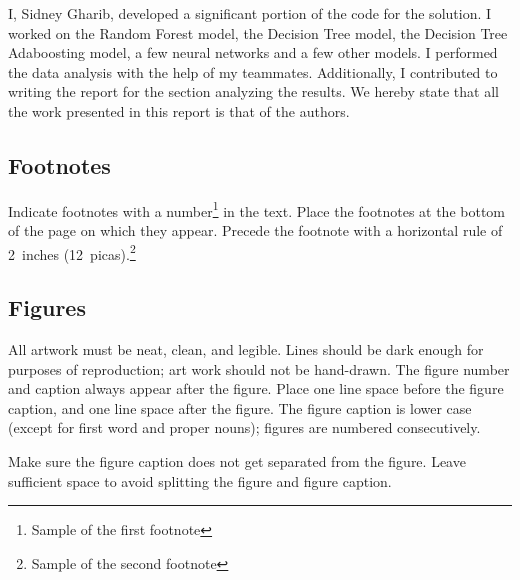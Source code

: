 \documentclass{article} %
\begin{document}
I, Sidney Gharib, developed a significant portion of the code for the solution.
I worked on the Random Forest model, the Decision Tree model, the Decision Tree Adaboosting model, a few neural networks and a few other models.
I performed the data analysis with the help of my teammates. Additionally, I contributed to writing the report for the section analyzing the results.
We hereby state that all the work presented in this report is that of the authors.



\subsection{Footnotes}

Indicate footnotes with a number\footnote{Sample of the first footnote} in the
text. Place the footnotes at the bottom of the page on which they appear.
Precede the footnote with a horizontal rule of 2~inches
(12~picas).\footnote{Sample of the second footnote}

\subsection{Figures}

All artwork must be neat, clean, and legible. Lines should be dark
enough for purposes of reproduction; art work should not be
hand-drawn. The figure number and caption always appear after the
figure. Place one line space before the figure caption, and one line
space after the figure. The figure caption is lower case (except for
first word and proper nouns); figures are numbered consecutively.

Make sure the figure caption does not get separated from the figure.
Leave sufficient space to avoid splitting the figure and figure caption.
\end{document}
